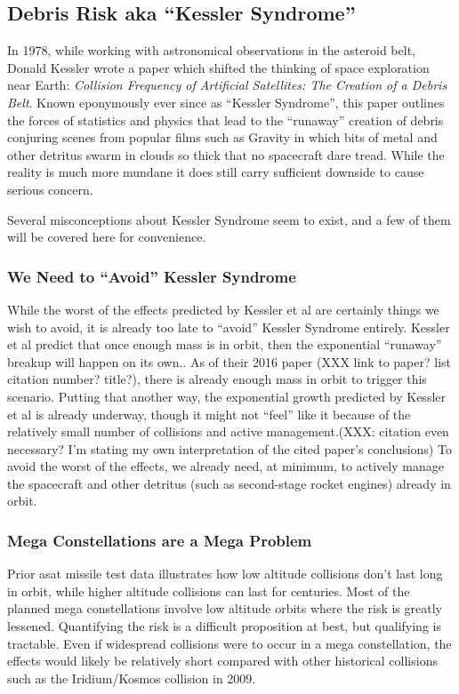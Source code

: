 \subsection{Debris Risk aka ``Kessler Syndrome''}

In 1978, while working with astronomical observations in the asteroid
belt, Donald Kessler wrote a paper which shifted the thinking of space
exploration near Earth: {\it Collision Frequency of Artificial
  Satellites: The Creation of a Debris Belt}.\cite{kessler-og} Known
eponymously ever since as ``Kessler Syndrome'', this paper outlines
the forces of statistics and physics that lead to the ``runaway''
creation of debris conjuring scenes from popular films such as Gravity
in which bits of metal and other detritus swarm in clouds so thick
that no spacecraft dare tread.  While the reality is much more mundane
it does still carry sufficient downside to cause serious concern.

Several misconceptions about Kessler Syndrome seem to exist, and a few
of them will be covered here for convenience.

\subsubsection{We Need to ``Avoid'' Kessler Syndrome}
While the worst of the effects predicted by Kessler et al are
certainly things we wish to avoid, it is already too late to ``avoid''
Kessler Syndrome entirely.  Kessler et al predict that once enough
mass is in orbit, then the exponential ``runaway'' breakup will happen
on its own.\cite[xxx]{kessler-reunion}.  As of their 2016 paper (XXX
link to paper?  list citation number?  title?), there is already
enough mass in orbit to trigger this
scenario.\cite[xxx]{kessler-reunion} Putting that another way, the
exponential growth predicted by Kessler et al is already underway,
though it might not ``feel'' like it because of the relatively small
number of collisions and active management.(XXX: citation even
necessary?  I'm stating my own interpretation of the cited paper's
conclusions) To avoid the worst of the effects, we already need, at
minimum, to actively manage the spacecraft and other detritus (such as
second-stage rocket engines) already in
orbit.\cite[xxx]{kessler-reunion}

\subsubsection{Mega Constellations are a Mega Problem}
Prior \ac{asat} missile test data illustrates how low altitude
collisions don't last long in orbit\cite[shakti analysis
  overview]{xxx}, while higher altitude collisions can last for
centuries.\cite[umm...]{xxx} Most of the planned mega constellations
involve low altitude orbits where the risk is greatly
lessened.\cite[cite my own work maybe?]{xxx} Quantifying the risk is a
difficult proposition at best, but qualifying is tractable.  Even if
widespread collisions were to occur in a mega constellation, the
effects would likely be relatively short compared with other
historical collisions such as the Iridium/Kosmos collision in
2009.\cite[my own youtube video maybe?]{xxx}

